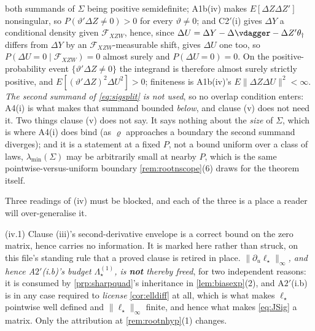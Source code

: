 \begin{lemma}[{The moment is valid, its variance is finite, its $\theta$-Jacobian is $-J$, and $J=E[\Delta Z\Delta Z']$}]
both summands of $\Sigma$ being positive semidefinite; A1b(iv) makes $E[\Delta Z\Delta Z']$ nonsingular, so
$P(\vartheta'\Delta Z\ne0)>0$ for every $\vartheta\ne0$; and C2$'$(i) gives $\Delta Y$ a conditional density
given $\mathcal F_{XZW}$, hence, since $\Delta U=\Delta Y-\Delta\vdagger-\Delta Z'\theta_\dagger$ differs
from $\Delta Y$ by an $\mathcal F_{XZW}$-measurable shift, gives $\Delta U$ one too, so
$P(\Delta U=0\mid\mathcal F_{XZW})=0$ almost surely and $P(\Delta U=0)=0$. On the positive-probability event
$\{\vartheta'\Delta Z\ne0\}$ the integrand is therefore almost surely strictly positive, and
$E[(\vartheta'\Delta Z)^{2}\Delta U^{2}]>0$; finiteness is A1b(iv)'s $E\|\Delta Z\Delta U\|^{2}<\infty$.
\emph{The second summand of \eqref{eq:sigsplit} is not used}, so no overlap condition enters: A4(i) is what
makes that summand bounded \emph{below}, and clause \textup{(v)} does not need it.
Two things clause \textup{(v)} does not say. It says nothing about the \emph{size} of $\Sigma$, which
is where A4(i) does bind (as $\varrho$ approaches a boundary the second summand diverges); and it is a
statement at a fixed $P$, not a bound uniform over a class of laws, $\lambda_{\min}(\Sigma)$ may be
arbitrarily small at nearby $P$, which is the same pointwise-versus-uniform boundary
\cref{rem:rootnscope}\textup{(6)} draws for the theorem itself.

Three readings of \textup{(iv)} must be blocked, and each of the three is a place a reader will
over-generalise it.

\textup{(iv.1)} Clause \textup{(iii)}'s second-derivative envelope is a correct bound on the zero
matrix, hence carries no information. It is marked here rather than struck, on this file's standing rule
that a proved clause is retired in place. \emph{$\|\partial_u\ell_\star\|_\infty$, and hence A$2'$(i.b)'s
budget $\Lambda^{(1)}_\star$, is \textbf{not} thereby freed}, for two independent reasons: it is consumed
by \cref{prp:sharpquad}'s inheritance in \cref{lem:biasexp}\textup{(2)}, and A$2'$(i.b) is in any case
required to \emph{license} \cref{cor:elldiff} at all, which is what makes $\ell_\star$ pointwise well
defined and $\|\ell_\star\|_\infty$ finite, and hence what makes \eqref{eq:JSig} a matrix. Only the
attribution at \cref{rem:rootnhyp}\textup{(1)} changes.


\end{lemma}
